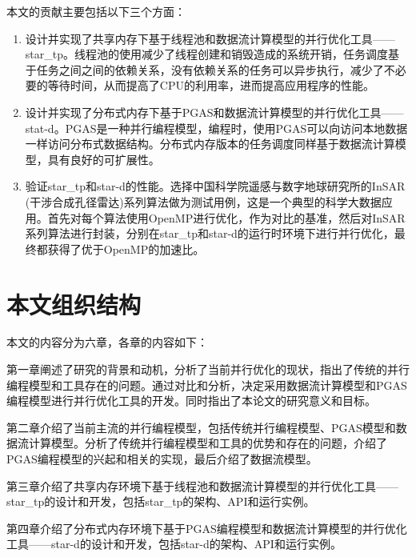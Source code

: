 本文的贡献主要包括以下三个方面：

\begin{enumerate}
	\item 设计并实现了共享内存下基于线程池和数据流计算模型的并行优化工具——star\_tp。线程池的使用减少了线程创建和销毁造成的系统开销，任务调度基于任务之间之间的依赖关系，没有依赖关系的任务可以异步执行，减少了不必要的等待时间，从而提高了CPU的利用率，进而提高应用程序的性能。
	\item 设计并实现了分布式内存下基于PGAS和数据流计算模型的并行优化工具——stat-d。PGAS是一种并行编程模型，编程时，使用PGAS可以向访问本地数据一样访问分布式数据结构。分布式内存版本的任务调度同样基于数据流计算模型，具有良好的可扩展性。
	\item 验证star\_tp和star-d的性能。选择中国科学院遥感与数字地球研究所的InSAR (干涉合成孔径雷达)系列算法做为测试用例，这是一个典型的科学大数据应用。首先对每个算法使用OpenMP进行优化，作为对比的基准，然后对InSAR系列算法进行封装，分别在star\_tp和star-d的运行时环境下进行并行优化，最终都获得了优于OpenMP的加速比。
\end{enumerate}

\section{本文组织结构}

本文的内容分为六章，各章的内容如下：

第一章阐述了研究的背景和动机，分析了当前并行优化的现状，指出了传统的并行编程模型和工具存在的问题。通过对比和分析，决定采用数据流计算模型和PGAS编程模型进行并行优化工具的开发。同时指出了本论文的研究意义和目标。

第二章介绍了当前主流的并行编程模型，包括传统并行编程模型、PGAS模型和数据流计算模型。分析了传统并行编程模型和工具的优势和存在的问题，介绍了PGAS编程模型的兴起和相关的实现，最后介绍了数据流模型。

第三章介绍了共享内存环境下基于线程池和数据流计算模型的并行优化工具——star\_tp的设计和开发，包括star\_tp的架构、API和运行实例。

第四章介绍了分布式内存环境下基于PGAS编程模型和数据流计算模型的并行优化工具——star-d的设计和开发，包括star-d的架构、API和运行实例。

第五章介绍了使用star\_tp和star-d优化中国科学院遥感与数字地球研究所的InSAR系列算法。包括使用OpenMP对InSAR系列算法进行并行优化，优化结果作为对比基准，然后分别将InSAR的算法接口进行简单的封装，分别作为任务插入star\_tp和star-d的运行时环境中进行并行优化。

第六章总结了本论文的所有工作，指出了所做工作的贡献，同时也指出了工作中存在的不足，提出了后续改进的建议。
